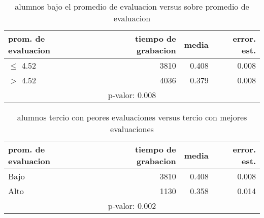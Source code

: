 \documentclass[spanish]{article}
\begin{document}
\begin{table}[h!]
\begin{center}
\begin{tabular}{|l|r|r|r|}
\hline
prom. de evaluacion & tiempo de grabacion & media          & error. est.     \\ \hline
$\leq$ 4.52             &                3810 &          0.408 &            0.008\\ \hline
$>$ 4.52              &                4036 &          0.379 &            0.008\\ \hline
\multicolumn{4}{|c|}{p-valor: 0.008} \\ \hline
\end{tabular}
\caption{alumnos bajo el promedio de evaluacion versus sobre promedio de evaluacion}
\end{center}
\end{table}

\begin{table}[h!]
\begin{center}
\begin{tabular}{|l|r|r|r|}
\hline
prom. de evaluacion & tiempo de grabacion & media          & error. est.     \\ \hline
Bajo                &                3810 &          0.408 &            0.008\\ \hline
Alto                &                1130 &          0.358 &            0.014\\ \hline
\multicolumn{4}{|c|}{p-valor: 0.002} \\ \hline
\end{tabular}
\caption{alumnos tercio con peores evaluaciones versus tercio con mejores evaluaciones}
\end{center}
\end{table}
\end{document}
